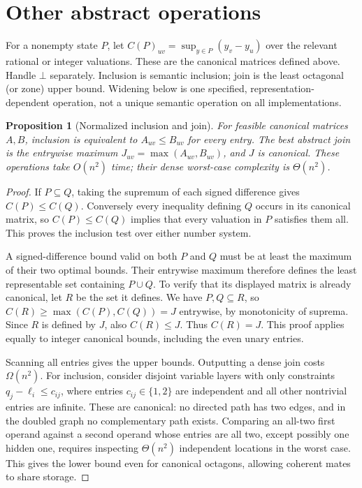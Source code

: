 \documentclass[manuscript,11pt,screen,nonacm]{acmart}
\newtheorem{proposition}[theorem]{Proposition}
\theoremstyle{definition}
\begin{document}
\section{Other abstract operations}\label{sec:operations}
For a nonempty state $P$, let $C(P)_{uv}=\sup_{y\in P}(y_v-y_u)$ over the relevant rational or integer valuations. These are the canonical matrices defined above. Handle $\bot$ separately. Inclusion is semantic inclusion; join is the least octagonal (or zone) upper bound. Widening below is one specified, representation-dependent operation, not a unique semantic operation on all implementations.

\begin{proposition}[Normalized inclusion and join]\label{prop:join}
For feasible canonical matrices $A,B$, inclusion is equivalent to $A_{uv}\leq B_{uv}$ for every entry. The best abstract join is the entrywise maximum $J_{uv}=\max(A_{uv},B_{uv})$, and $J$ is canonical. These operations take $O(n^2)$ time; their dense worst-case complexity is $\Theta(n^2)$.
\end{proposition}
\begin{proof}
If $P\subseteq Q$, taking the supremum of each signed difference gives $C(P)\leq C(Q)$. Conversely every inequality defining $Q$ occurs in its canonical matrix, so $C(P)\leq C(Q)$ implies that every valuation in $P$ satisfies them all. This proves the inclusion test over either number system.

A signed-difference bound valid on both $P$ and $Q$ must be at least the maximum of their two optimal bounds. Their entrywise maximum therefore defines the least representable set containing $P\cup Q$. To verify that its displayed matrix is already canonical, let $R$ be the set it defines. We have $P,Q\subseteq R$, so $C(R)\geq\max(C(P),C(Q))=J$ entrywise, by monotonicity of suprema. Since $R$ is defined by $J$, also $C(R)\leq J$. Thus $C(R)=J$. This proof applies equally to integer canonical bounds, including the even unary entries.

Scanning all entries gives the upper bounds. Outputting a dense join costs $\Omega(n^2)$. For inclusion, consider disjoint variable layers with only constraints $q_j-\ell_i\leq c_{ij}$, where entries $c_{ij}\in\{1,2\}$ are independent and all other nontrivial entries are infinite. These are canonical: no directed path has two edges, and in the doubled graph no complementary path exists. Comparing an all-two first operand against a second operand whose entries are all two, except possibly one hidden one, requires inspecting $\Theta(n^2)$ independent locations in the worst case. This gives the lower bound even for canonical octagons, allowing coherent mates to share storage.
\end{proof}
\end{document}
